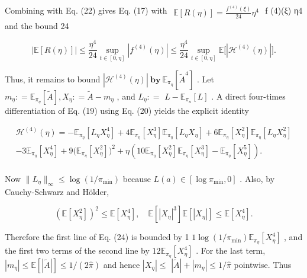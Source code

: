 \documentclass[
  10
]{article}
\begin{document}
Combining with Eq. (22) gives Eq. (17) with
\(\begin{array} { r } { \mathbb { E } [ R ( \eta ) ] = \frac { f ^ { ( 4 ) } ( \xi ) } { 2 4 } \eta ^ { 4 } } \end{array}\)
f (4)(ξ) η4 and the bound 24

\[
\left| \mathbb {E} [ R (\eta) ] \right| \leq \frac {\eta^ {4}}{2 4} \sup _ {t \in [ 0, \eta ]} | f ^ {(4)} (\eta) | \leq \frac {\eta^ {4}}{2 4} \sup _ {t \in [ 0, \eta ]} \mathbb {E} \big [ | \mathcal {H} ^ {(4)} (\eta) | \big ]. \tag {23}
\]

Thus, it remains to bound
\(| \mathcal { H } ^ { ( 4 ) } ( \eta ) | \ \mathbf { b y } \ \mathbb { E } _ { \pi _ { \eta } } [ \tilde { A } ^ { 4 } ]\)
. Let
\(m _ { \eta } : = \mathbb { E } _ { \pi _ { \eta } } [ \tilde { A } ] , X _ { \eta } : = \tilde { A } - m _ { \eta }\)
, and \(L _ { \eta } : =\) \(L - \mathbb { E } _ { \pi _ { n } } [ L ]\)
. A direct four-times differentiation of Eq. (19) using Eq. (20) yields
the explicit identity

\[
\begin{array}{l} \mathcal {H} ^ {(4)} (\eta) = - \mathbb {E} _ {\pi_ {\eta}} [ L _ {\eta} X _ {\eta} ^ {4} ] + 4 \mathbb {E} _ {\pi_ {\eta}} [ X _ {\eta} ^ {3} ] \mathbb {E} _ {\pi_ {\eta}} [ L _ {\eta} X _ {\eta} ] + 6 \mathbb {E} _ {\pi_ {\eta}} [ X _ {\eta} ^ {2} ] \mathbb {E} _ {\pi_ {\eta}} [ L _ {\eta} X _ {\eta} ^ {2} ] \\ - 3 \mathbb {E} _ {\pi_ {\eta}} [ X _ {\eta} ^ {4} ] + 9 \big (\mathbb {E} _ {\pi_ {\eta}} [ X _ {\eta} ^ {2} ] \big) ^ {2} + \eta \left(1 0 \mathbb {E} _ {\pi_ {\eta}} [ X _ {\eta} ^ {2} ] \mathbb {E} _ {\pi_ {\eta}} [ X _ {\eta} ^ {3} ] - \mathbb {E} _ {\pi_ {\eta}} [ X _ {\eta} ^ {5} ]\right). \tag {24} \\ \end{array}
\]

Now
\(\| L _ { \eta } \| _ { \infty } \le \log ( 1 / \pi _ { \operatorname* { m i n } } )\)
because \(L ( a ) \in [ \log \pi _ { \operatorname* { m i n } } , 0 ]\)
. Also, by Cauchy-Schwarz and Hölder,

\[
(\mathbb {E} [ X _ {\eta} ^ {2} ]) ^ {2} \leq \mathbb {E} [ X _ {\eta} ^ {4} ], \quad \mathbb {E} [ | X _ {\eta} | ^ {3} ] \mathbb {E} [ | X _ {\eta} | ] \leq \mathbb {E} [ X _ {\eta} ^ {4} ].
\]

Therefore the first line of Eq. (24) is bounded by 1
\(1 \log ( 1 / \pi _ { \operatorname* { m i n } } ) \mathbb { E } _ { \pi _ { \eta } } [ X _ { \eta } ^ { 4 } ]\)
, and the first two terms of the second line by
\(1 2 \mathbb { E } _ { \pi _ { \eta } } [ X _ { \eta } ^ { 4 } ]\) .
For the last term,
\(| m _ { \eta } | \leq \mathbb { E } [ | \tilde { A } | ] \leq 1 / ( 2 \hat { \pi } )\)
and hence \(| X _ { \eta } | \le\)
\(| \tilde { A } | + | m _ { \eta } | \leq 1 / \hat { \pi }\) pointwise.
Thus
\end{document}

